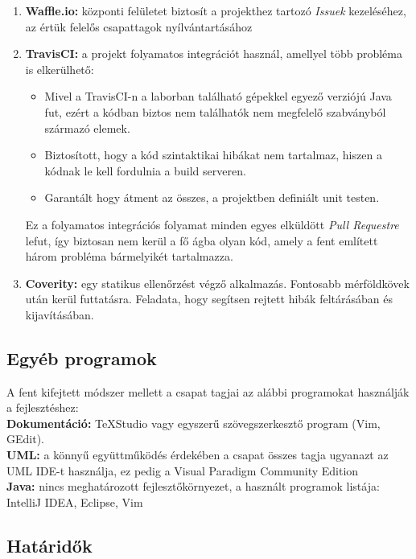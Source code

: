 \begin{enumerate}
    \item \textbf{Waffle.io:} központi felületet biztosít a projekthez tartozó \textit{Issuek} kezeléséhez, az értük felelős csapattagok nyílvántartásához
    \item \textbf{TravisCI:} a projekt folyamatos integrációt használ, amellyel több probléma is elkerülhető:
        \begin{itemize}
            \item Mivel a TravisCI-n a laborban található gépekkel egyező verziójú Java fut, ezért a kódban biztos nem találhatók nem megfelelő szabványból származó elemek. 
            \item Biztosított, hogy a kód szintaktikai hibákat nem tartalmaz, hiszen a kódnak le kell fordulnia a build serveren. 
            \item Garantált hogy átment az összes, a projektben definiált unit testen. 
        \end{itemize} 
        Ez a folyamatos integrációs folyamat minden egyes elküldött \textit{Pull Requestre} lefut, így biztosan nem kerül a fő ágba olyan kód, amely a fent említett három probléma bármelyikét tartalmazza.
    \item \textbf{Coverity:} egy statikus ellenőrzést végző alkalmazás. Fontosabb mérföldkövek után kerül futtatásra. Feladata, hogy segítsen rejtett hibák feltárásában és kijavításában.
\end{enumerate}


\subsection{Egyéb programok}
A fent kifejtett módszer mellett a csapat tagjai az alábbi programokat használják a fejlesztéshez: \\ 

\noindent \textbf{Dokumentáció:} TeXStudio vagy egyszerű szövegszerkesztő program (Vim, GEdit). \\

\noindent \textbf{UML:} a könnyű együttműködés érdekében a csapat összes tagja ugyanazt az UML IDE-t használja, ez pedig a Visual Paradigm Community Edition \\

\noindent \textbf{Java:} nincs meghatározott fejlesztőkörnyezet, a használt programok listája: IntelliJ IDEA, Eclipse, Vim

\subsection{Határidők}

